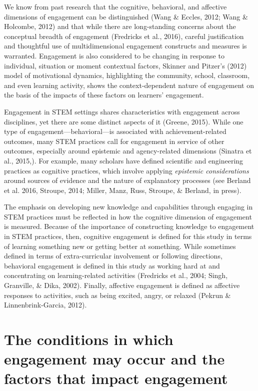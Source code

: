 \documentclass[]{book}
\theoremstyle{definition}
\theoremstyle{definition}
\theoremstyle{definition}
\theoremstyle{remark}
\begin{document}
We know from past research that the cognitive, behavioral, and affective
dimensions of engagement can be distinguished (Wang \& Eccles, 2012;
Wang \& Holcombe, 2012) and that while there are long-standing concerns
about the conceptual breadth of engagement (Fredricks et al., 2016),
careful justification and thoughtful use of multidimensional engagement
constructs and measures is warranted. Engagement is also considered to
be changing in response to individual, situation or moment contextual
factors, Skinner and Pitzer's (2012) model of motivational dynamics,
highlighting the community, school, classroom, and even learning
activity, shows the context-dependent nature of engagement on the basis
of the impacts of these factors on learners' engagement.

Engagement in STEM settings shares characteristics with engagement
across disciplines, yet there are some distinct aspects of it (Greene,
2015). While one type of engagement---behavioral---is associated with
achievement-related outcomes, many STEM practices call for engagement in
service of other outcomes, especially around epistemic and
agency-related dimensions (Sinatra et al., 2015,). For example, many
scholars have defined scientific and engineering practices as cognitive
practices, which involve applying \emph{epistemic considerations} around
sources of evidence and the nature of explanatory processes (see Berland
et al. 2016, Stroupe, 2014; Miller, Manz, Russ, Stroupe, \& Berland, in
press).

The emphasis on developing new knowledge and capabilities through
engaging in STEM practices must be reflected in how the cognitive
dimension of engagement is measured. Because of the importance of
constructing knowledge to engagement in STEM practices, then, cognitive
engagement is defined for this study in terms of learning something new
or getting better at something. While sometimes defined in terms of
extra-curricular involvement or following directions, behavioral
engagement is defined in this study as working hard at and concentrating
on learning-related activities (Fredricks et al., 2004; Singh,
Granville, \& Dika, 2002). Finally, affective engagement is defined as
affective responses to activities, such as being excited, angry, or
relaxed (Pekrun \& Linnenbrink-Garcia, 2012).

\section{The conditions in which engagement may occur and the factors
that impact
engagement}\label{the-conditions-in-which-engagement-may-occur-and-the-factors-that-impact-engagement}
\end{document}
